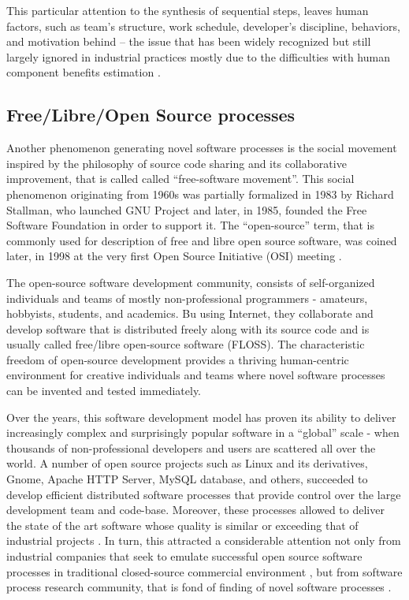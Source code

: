 This particular attention to the synthesis of sequential steps, leaves human factors, such as team's 
structure, work schedule, developer's discipline, behaviors, and motivation behind -- 
the issue that has been widely recognized \cite{citeulike:149387} \cite{citeulike:113403} 
\cite{citeulike:205322} \cite{citeulike:12798652} but still largely ignored in industrial practices 
mostly due to the  difficulties with human component benefits estimation 
\cite{citeulike:12798659} \cite{citeulike:12798662} \cite{csdl2-12-11}.

%
%
\subsection{Free/Libre/Open Source processes}
Another phenomenon generating novel software processes is the social movement inspired by the philosophy 
of source code sharing and its collaborative improvement, that is called called ``free-software movement''. 
This social phenomenon originating from 1960s was partially formalized in 1983 by Richard Stallman,
who launched GNU Project and later, in 1985, founded the Free Software Foundation in order to support 
it. The ``open-source'' term, that is commonly used for description of free and libre open source software, 
was coined later, in 1998 at the very first Open Source Initiative (OSI) meeting \cite{osi-history}.

The open-source software development community, consists of self-organized individuals and teams of 
mostly non-professional programmers - amateurs, hobbyists, students, and academics. 
Bu using Internet, they collaborate and develop software that is distributed freely along with its 
source code and is usually called free/libre open-source software (FLOSS). 
The characteristic freedom of open-source development provides a thriving human-centric environment 
for creative individuals and teams where novel software processes can be invented and tested immediately.

Over the years, this software development model has proven its ability to deliver increasingly complex 
and surprisingly popular software in a ``global'' scale - when thousands of non-professional developers 
and users are scattered all over the world. A number of open source projects such as Linux and its 
derivatives, Gnome, Apache HTTP Server, MySQL database, and others, succeeded to develop efficient 
distributed software processes that provide control over the large development team and code-base.
Moreover, these processes allowed to deliver the state of the art software whose quality is similar 
or exceeding that of industrial projects \cite{coverity2012}. 
In turn, this attracted a considerable attention not only from industrial companies that seek to emulate 
successful open source software processes in traditional closed-source commercial environment 
\cite{oss_virtual_organizations} \cite{oss_balance} \cite{oss_hp} \cite{oss_4industry}, 
but from software process research community, that is fond of finding of novel software processes
\cite{citeulike:12550640} \cite{citeulike:5043664} \cite{citeulike:5128808} \cite{citeulike:10377366}.

